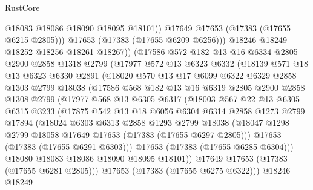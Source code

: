 \begin{lexlean}{RustCore}
\begin{coremodule}
                  @18083
                  @18086
                  @18090
                  @18095
                  @18101))
              @17649
              @17653
              (@17383 (@17655 @6215 @2805)))
            @17653
            (@17383 (@17655 @6209 @6256)))
          @18246
          @18249
          @18252
          @18256
          @18261
          @18267))
      (@17586
        @572
        @182
        @13
        @16
        @6334
        @2805
        @2900
        @2858
        @1318
        @2799
        (@17977
          @572
          @13
          @6323
          @6332
          (@18139
            @571
            @18
            @13
            @6323
            @6330
            @2891
            (@18020
              @570
              @13
              @17
              @6099
              @6322
              @6329
              @2858
              @1303
              @2799
              @18038
              (@17586
                @568
                @182
                @13
                @16
                @6319
                @2805
                @2900
                @2858
                @1308
                @2799
                (@17977
                  @568
                  @13
                  @6305
                  @6317
                  (@18003
                    @567
                    @22
                    @13
                    @6305
                    @6315
                    @3233
                    (@17875
                      @542
                      @13
                      @18
                      @6056
                      @6304
                      @6314
                      @2858
                      @1273
                      @2799
                      @17894
                      (@18024
                        @6303
                        @6313
                        @2858
                        @1293
                        @2799
                        @18038
                        (@18047 @1298 @2799 @18058 @17649 @17653 (@17383 (@17655 @6297 @2805)))
                        @17653
                        (@17383 (@17655 @6291 @6303)))
                      @17653
                      (@17383 (@17655 @6285 @6304)))
                    @18080
                    @18083
                    @18086
                    @18090
                    @18095
                    @18101))
                @17649
                @17653
                (@17383 (@17655 @6281 @2805)))
              @17653
              (@17383 (@17655 @6275 @6322)))
            @18246
            @18249

\end{coremodule}
\end{lexlean}
